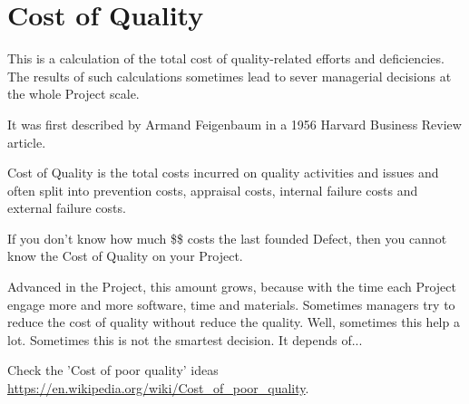 \section{Cost of Quality}
\label{sec:Cost of Quality}

This is a calculation of the total cost of quality-related efforts and deficiencies. The results of such calculations sometimes lead to sever managerial decisions at the whole Project scale.

It was first described by Armand Feigenbaum in a 1956 Harvard Business Review article.

Cost of Quality is the total costs incurred on quality activities and issues and often split into prevention costs, appraisal costs, internal failure costs and external failure costs.

If you don't know how much \$\$ costs the last founded Defect, then you cannot know the Cost of Quality on your Project.

Advanced in the Project, this amount grows, because with the time each Project engage more and more software, time and materials. Sometimes managers try to reduce the cost of quality without reduce the quality. Well, sometimes this help a lot. Sometimes this is not the smartest decision. It depends of...

Check the 'Cost of poor quality' ideas \url{https://en.wikipedia.org/wiki/Cost_of_poor_quality}.

